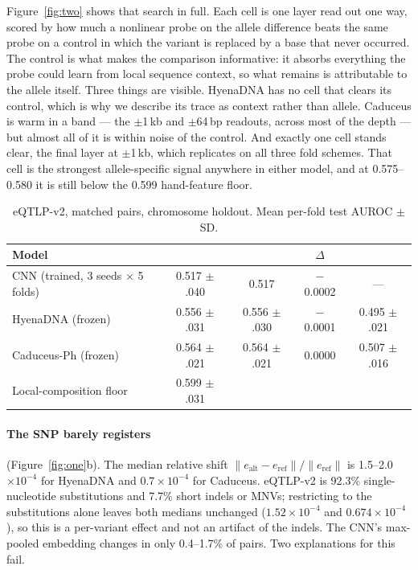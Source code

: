 \ifdefined\RECOMB
Figure~\ref{fig:two} shows that search in full. Each cell is one layer read out
one way, scored by how much a nonlinear probe on the allele difference beats the
same probe on a control in which the variant is replaced by a base that never
occurred. The control is what makes the comparison informative: it absorbs
everything the probe could learn from local sequence context, so what remains is
attributable to the allele itself. Three things are visible. HyenaDNA has no cell
that clears its control, which is why we describe its trace as context rather
than allele. Caduceus is warm in a band --- the $\pm$1\,kb and $\pm$64\,bp
readouts, across most of the depth --- but almost all of it is within noise of
the control. And exactly one cell stands clear, the final layer at $\pm$1\,kb,
which replicates on all three fold schemes. That cell is the strongest
allele-specific signal anywhere in either model, and at 0.575--0.580 it is still
below the 0.599 hand-feature floor.

\fi

\begin{table}[tb]
\centering
\caption{eQTLP-v2, matched pairs, chromosome holdout. Mean per-fold test AUROC
$\pm$ SD.}
\label{tab:v2}
\small
\begin{tabular}{lcccc}
\toprule
Model & {} & {} & $\Delta$ & \diffonly{} \\
\midrule
CNN (trained, 3 seeds $\times$ 5 folds) & 0.517 $\pm$ .040 & 0.517 & $-$0.0002 & --- \\
HyenaDNA (frozen)    & 0.556 $\pm$ .031 & 0.556 $\pm$ .030 & $-$0.0001 & 0.495 $\pm$ .021 \\
Caduceus-Ph (frozen) & 0.564 $\pm$ .021 & 0.564 $\pm$ .021 & 0.0000 & 0.507 $\pm$ .016 \\
Local-composition floor & 0.599 $\pm$ .031 & & & \\
\bottomrule
\end{tabular}
\end{table}

\paragraph{The SNP barely registers} (Figure~\ref{fig:one}b). The median relative
shift $\|e_{\mathrm{alt}} - e_{\mathrm{ref}}\| / \|e_{\mathrm{ref}}\|$ is
1.5--2.0 $\times 10^{-4}$ for HyenaDNA and $0.7 \times 10^{-4}$ for Caduceus.
eQTLP-v2 is 92.3\% single-nucleotide substitutions and 7.7\% short indels or
MNVs; restricting to the substitutions alone leaves both medians unchanged
($1.52 \times 10^{-4}$ and $0.674 \times 10^{-4}$), so this is a per-variant
effect and not an artifact of the indels. The
CNN's max-pooled embedding changes in only 0.4--1.7\% of pairs. Two explanations
for this fail.

